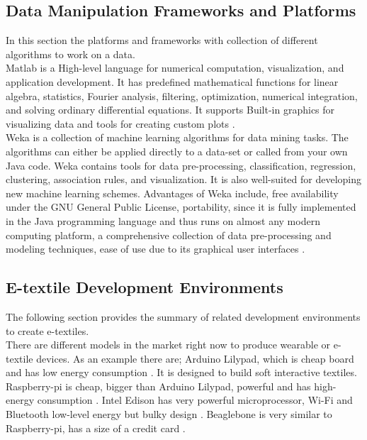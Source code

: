 \subsection{Data Manipulation Frameworks and Platforms}
In this section the platforms and frameworks with collection of different algorithms to work on a data.\\

Matlab is a High-level language for numerical computation, visualization, and application development. It has predefined mathematical functions for linear algebra, statistics, Fourier analysis, filtering, optimization, numerical integration, and solving ordinary differential equations. It supports Built-in graphics for visualizing data and tools for creating custom plots \cite{20}. \\

Weka is a collection of machine learning algorithms for data mining tasks. The algorithms can either be applied directly to a data-set or called from your own Java code. Weka contains tools for data pre-processing, classification, regression, clustering, association rules, and visualization. It is also well-suited for developing new machine learning schemes. Advantages of Weka include, free availability under the GNU General Public License, portability, since it is fully implemented in the Java programming language and thus runs on almost any modern computing platform, a comprehensive collection of data pre-processing and modeling techniques, ease of use due to its graphical user interfaces \cite{21}. \\

\subsection{E-textile Development Environments}

The following section provides the summary of related development environments to create e-textiles. \\ 

	There are different models in the market right now to produce wearable or e-textile devices. As an example there are; Arduino Lilypad, which is cheap board and has low energy consumption \cite{7}. It is designed to build soft interactive textiles. Raspberry-pi is cheap, bigger than Arduino Lilypad, powerful and has high-energy consumption \cite{23}. Intel Edison has very powerful microprocessor, Wi-Fi and Bluetooth low-level energy but bulky design \cite{24}. Beaglebone is very similar to Raspberry-pi, has a size of a credit card \cite{22}. \\


